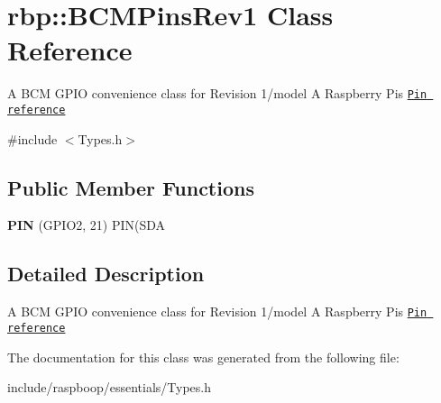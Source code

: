 \hypertarget{classrbp_1_1BCMPinsRev1}{}\section{rbp\+:\+:B\+C\+M\+Pins\+Rev1 Class Reference}
\label{classrbp_1_1BCMPinsRev1}


A B\+C\+M G\+P\+I\+O convenience class for Revision 1/model A Raspberry Pi\textquotesingle{}s \href{http://wiringpi.com/pins/}{\tt Pin reference}  




{\ttfamily \#include $<$Types.\+h$>$}

\subsection*{Public Member Functions}
\begin{DoxyCompactItemize}
\item 
\hypertarget{classrbp_1_1BCMPinsRev1_a3e7e57d2869bf7c9d0e5b4b2734f2cf1}{}{\bfseries P\+I\+N} (G\+P\+I\+O2, 21) P\+I\+N(S\+D\+A\label{classrbp_1_1BCMPinsRev1_a3e7e57d2869bf7c9d0e5b4b2734f2cf1}

\end{DoxyCompactItemize}


\subsection{Detailed Description}
A B\+C\+M G\+P\+I\+O convenience class for Revision 1/model A Raspberry Pi\textquotesingle{}s \href{http://wiringpi.com/pins/}{\tt Pin reference} 

The documentation for this class was generated from the following file\+:\begin{DoxyCompactItemize}
\item 
include/raspboop/essentials/Types.\+h\end{DoxyCompactItemize}
